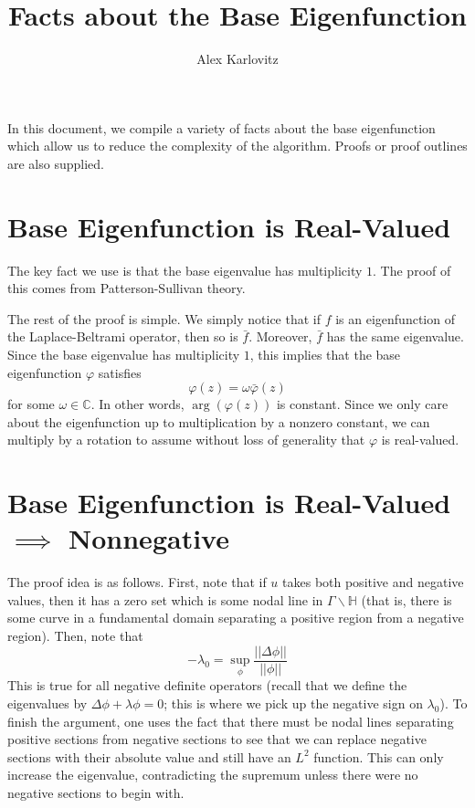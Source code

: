 \documentclass[]{article}
\title{Facts about the Base Eigenfunction}
\author{Alex Karlovitz}
\date{}
\begin{document}
	
	\maketitle
	
In this document, we compile a variety of facts about the base eigenfunction which allow us to reduce the complexity of the algorithm.
Proofs or proof outlines are also supplied.
	
\section*{Base Eigenfunction is Real-Valued}

The key fact we use is that the base eigenvalue has multiplicity $1$.
The proof of this comes from Patterson-Sullivan theory.

The rest of the proof is simple.
We simply notice that if $f$ is an eigenfunction of the Laplace-Beltrami operator, then so is $\bar{f}$.
Moreover, $\bar{f}$ has the same eigenvalue.
Since the base eigenvalue has multiplicity $1$, this implies that the base eigenfunction $\varphi$ satisfies
$$
\varphi(z) = \omega\bar{\varphi}(z)
$$
for some $\omega \in \mathbb{C}$.
In other words, $\arg(\varphi(z))$ is constant.
Since we only care about the eigenfunction up to multiplication by a nonzero constant, we can multiply by a rotation to assume without loss of generality that $\varphi$ is real-valued.

\section*{Base Eigenfunction is Real-Valued $\implies$ Nonnegative}

The proof idea is as follows.
First, note that if $u$ takes both positive and negative values, then it has a zero set which is some nodal line in $\Gamma\backslash\mathbb{H}$ (that is, there is some curve in a fundamental domain separating a positive region from a negative region).
Then, note that
$$
-\lambda_0 = \sup_{\phi}\frac{||\Delta\phi||}{||\phi||}
$$
This is true for all negative definite operators (recall that we define the eigenvalues by $\Delta \phi + \lambda \phi = 0$; this is where we pick up the negative sign on $\lambda_0$).
To finish the argument, one uses the fact that there must be nodal lines separating positive sections from negative sections to see that we can replace negative sections with their absolute value and still have an $L^2$ function.
This can only increase the eigenvalue, contradicting the supremum unless there were no negative sections to begin with.
\end{document}

